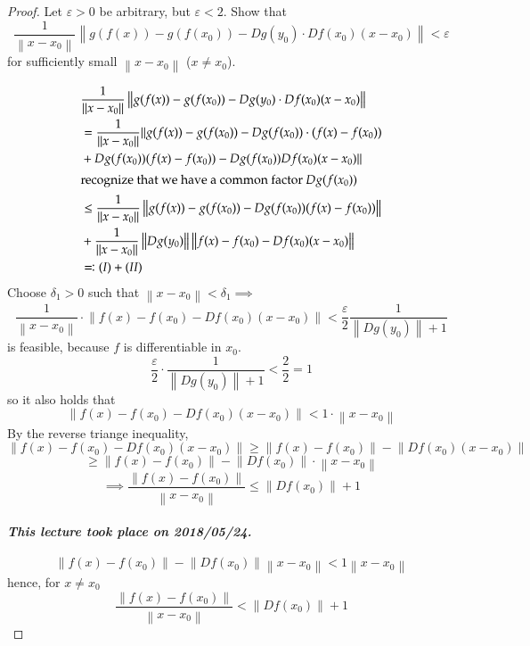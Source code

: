 \documentclass{article}
\newcommand{\norm}[1]{\left\|#1\right\|}
\newcommand{\dateref}[1]{\paragraph{\textit{This lecture took place on #1.}}}
\begin{document}
\begin{proof}
  Let $\varepsilon > 0$ be arbitrary, but $\varepsilon < 2$.
  Show that
  \[ \frac1{\norm{x - x_0}} \norm{g(f(x)) - g(f(x_0)) - Dg(y_0) \cdot Df(x_0) (x - x_0)} < \varepsilon \]
  for sufficiently small $\norm{x - x_0}$ ($x \neq x_0$).

  \begin{align*}
    &\frac1{\norm{x - x_0}} \norm{g(f(x)) - g(f(x_0)) - Dg(y_0) \cdot Df(x_0) (x - x_0)} \\
    &= \frac1{\norm{x - x_0}} \| g(f(x)) - g(f(x_0)) - Dg(f(x_0)) \cdot (f(x) - f(x_0)) \\
    &+ Dg(f(x_0)) (f(x) - f(x_0)) - Dg(f(x_0)) Df(x_0) (x - x_0) \| \\
  \intertext{recognize that we have a common factor $Dg(f(x_0))$}
    &\leq \frac{1}{\norm{x - x_0}} \norm{g(f(x)) - g(f(x_0)) - Dg(f(x_0))(f(x) - f(x_0))} \\
    &+ \frac{1}{\norm{x - x_0}} \norm{Dg(y_0)} \norm{f(x) - f(x_0) - Df(x_0)(x - x_0)} \\
    &\eqqcolon (I) + (II)
  \end{align*}
  Choose $\delta_1 > 0$ such that $\norm{x - x_0} < \delta_1 \implies$
  \[ \frac{1}{\norm{x - x_0}} \cdot \norm{f(x) - f(x_0) - Df(x_0) (x - x_0)} < \frac{\varepsilon}2 \frac{1}{\norm{Dg(y_0)} + 1} \]
  is feasible, because $f$ is differentiable in $x_0$.
  \[ \frac{\varepsilon}{2} \cdot \frac{1}{\norm{Dg(y_0)} + 1} < \frac22 = 1 \]
  so it also holds that
  \[ \norm{f(x) - f(x_0) - Df(x_0) (x - x_0)} < 1 \cdot \norm{x - x_0} \]
  By the reverse triange inequality,
  \[ \norm{f(x) - f(x_0) - Df(x_0) (x - x_0)} \geq \norm{f(x) - f(x_0)} - \norm{Df(x_0) (x - x_0)} \]
  \[ \geq \norm{f(x) - f(x_0)} - \norm{Df(x_0)} \cdot \norm{x - x_0} \]
  \[ \implies \frac{\norm{f(x) - f(x_0)}}{\norm{x - x_0}} \leq \norm{Df(x_0)} + 1 \]

  \dateref{2018/05/24}

  \[ \norm{f(x) - f(x_0)} - \norm{Df(x_0)} \norm{x - x_0} < 1 \norm{x - x_0} \]
  hence, for $x \neq x_0$
  \[ \frac{\norm{f(x) - f(x_0)}}{\norm{x - x_0}} < \norm{Df(x_0)} + 1 \]


\end{proof}
\end{document}
